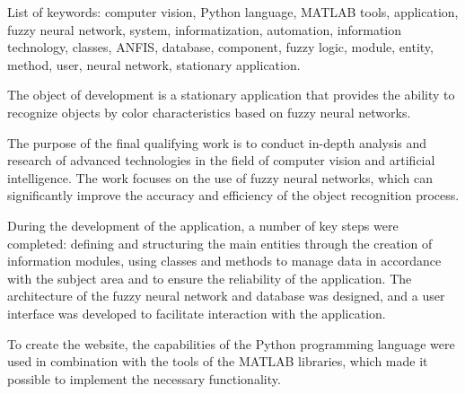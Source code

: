 List of keywords: computer vision, Python language, MATLAB tools, application, fuzzy neural network, system, informatization, automation, information technology, classes, ANFIS, database, component, fuzzy logic, module, entity, method, user, neural network, stationary application.

The object of development is a stationary application that provides the ability to recognize objects by color characteristics based on fuzzy neural networks.

The purpose of the final qualifying work is to conduct in-depth analysis and research of advanced technologies in the field of computer vision and artificial intelligence. The work focuses on the use of fuzzy neural networks, which can significantly improve the accuracy and efficiency of the object recognition process.

During the development of the application, a number of key steps were completed: defining and structuring the main entities through the creation of information modules, using classes and methods to manage data in accordance with the subject area and to ensure the reliability of the application. The architecture of the fuzzy neural network and database was designed, and a user interface was developed to facilitate interaction with the application.

To create the website, the capabilities of the Python programming language were used in combination with the tools of the MATLAB libraries, which made it possible to implement the necessary functionality.
